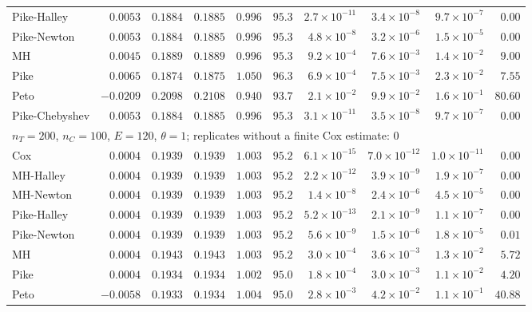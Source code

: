 \begin{landscape}
\begin{longtable}{lrrrrrrrrr}
Pike-Halley & $0.0053$ & $0.1884$ & $0.1885$ & $0.996$ & $95.3$ & $2.7 \times 10^{-11}$ & $3.4 \times 10^{-8}$ & $9.7 \times 10^{-7}$ & $0.00$ \\
Pike-Newton & $0.0053$ & $0.1884$ & $0.1885$ & $0.996$ & $95.3$ & $4.8 \times 10^{-8}$ & $3.2 \times 10^{-6}$ & $1.5 \times 10^{-5}$ & $0.00$ \\
MH & $0.0045$ & $0.1889$ & $0.1889$ & $0.996$ & $95.3$ & $9.2 \times 10^{-4}$ & $7.6 \times 10^{-3}$ & $1.4 \times 10^{-2}$ & $9.00$ \\
Pike & $0.0065$ & $0.1874$ & $0.1875$ & $1.050$ & $96.3$ & $6.9 \times 10^{-4}$ & $7.5 \times 10^{-3}$ & $2.3 \times 10^{-2}$ & $7.55$ \\
Peto & $-0.0209$ & $0.2098$ & $0.2108$ & $0.940$ & $93.7$ & $2.1 \times 10^{-2}$ & $9.9 \times 10^{-2}$ & $1.6 \times 10^{-1}$ & $80.60$ \\
Pike-Chebyshev & $0.0053$ & $0.1884$ & $0.1885$ & $0.996$ & $95.3$ & $3.1 \times 10^{-11}$ & $3.5 \times 10^{-8}$ & $9.7 \times 10^{-7}$ & $0.00$ \\
\multicolumn{10}{l}{$n_T = 200$, $n_C = 100$, $E = 120$, $\theta = 1$; replicates without a finite Cox estimate: 0} \\
Cox & $0.0004$ & $0.1939$ & $0.1939$ & $1.003$ & $95.2$ & $6.1 \times 10^{-15}$ & $7.0 \times 10^{-12}$ & $1.0 \times 10^{-11}$ & $0.00$ \\
MH-Halley & $0.0004$ & $0.1939$ & $0.1939$ & $1.003$ & $95.2$ & $2.2 \times 10^{-12}$ & $3.9 \times 10^{-9}$ & $1.9 \times 10^{-7}$ & $0.00$ \\
MH-Newton & $0.0004$ & $0.1939$ & $0.1939$ & $1.003$ & $95.2$ & $1.4 \times 10^{-8}$ & $2.4 \times 10^{-6}$ & $4.5 \times 10^{-5}$ & $0.00$ \\
Pike-Halley & $0.0004$ & $0.1939$ & $0.1939$ & $1.003$ & $95.2$ & $5.2 \times 10^{-13}$ & $2.1 \times 10^{-9}$ & $1.1 \times 10^{-7}$ & $0.00$ \\
Pike-Newton & $0.0004$ & $0.1939$ & $0.1939$ & $1.003$ & $95.2$ & $5.6 \times 10^{-9}$ & $1.5 \times 10^{-6}$ & $1.8 \times 10^{-5}$ & $0.01$ \\
MH & $0.0004$ & $0.1943$ & $0.1943$ & $1.003$ & $95.2$ & $3.0 \times 10^{-4}$ & $3.6 \times 10^{-3}$ & $1.3 \times 10^{-2}$ & $5.72$ \\
Pike & $0.0004$ & $0.1934$ & $0.1934$ & $1.002$ & $95.0$ & $1.8 \times 10^{-4}$ & $3.0 \times 10^{-3}$ & $1.1 \times 10^{-2}$ & $4.20$ \\
Peto & $-0.0058$ & $0.1933$ & $0.1934$ & $1.004$ & $95.0$ & $2.8 \times 10^{-3}$ & $4.2 \times 10^{-2}$ & $1.1 \times 10^{-1}$ & $40.88$ \\

\end{longtable}
\end{landscape}
